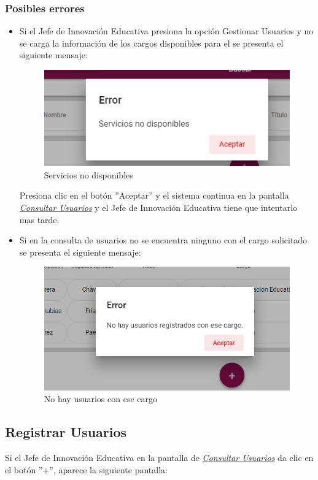 \subsubsection{Posibles errores}
\begin{itemize}
	\item Si el Jefe de Innovación Educativa  presiona la opción Gestionar Usuarios y no se carga la información de los cargos disponibles para el se presenta el siguiente mensaje:

	\begin{figure}[H]
		\centering
		\includegraphics[width=0.4\linewidth]{images/SP5/MSGSN}
		\caption{Servicios no disponibles}
		\label{SND-JIE}

	\end{figure}

	Presiona clic en el botón ''Aceptar'' y  el sistema continua en la pantalla  \hyperlink{consultarUs-JIE}{\textit{Consultar Usuarios}} y el Jefe de Innovación Educativa tiene que intentarlo  mas tarde.

	\item Si en la consulta de usuarios no se encuentra ninguno con el cargo solicitado se presenta el siguiente mensaje:
	\begin{figure}[H]
		\centering
		\includegraphics[width=0.4\linewidth]{images/SP5/MSG21}
		\caption{No hay usuarios con ese cargo}
		\label{mensaje21-JIE}
	\end{figure}

\end{itemize}


\newpage
\hypertarget{registrarUs-JIE}{}
\subsection{Registrar Usuarios}
Si el Jefe de Innovación Educativa  en la pantalla de \hyperlink{consultarUs-JIE}{\textit{Consultar Usuarios}} da clic en el botón ''+'', aparece la siguiente pantalla:


